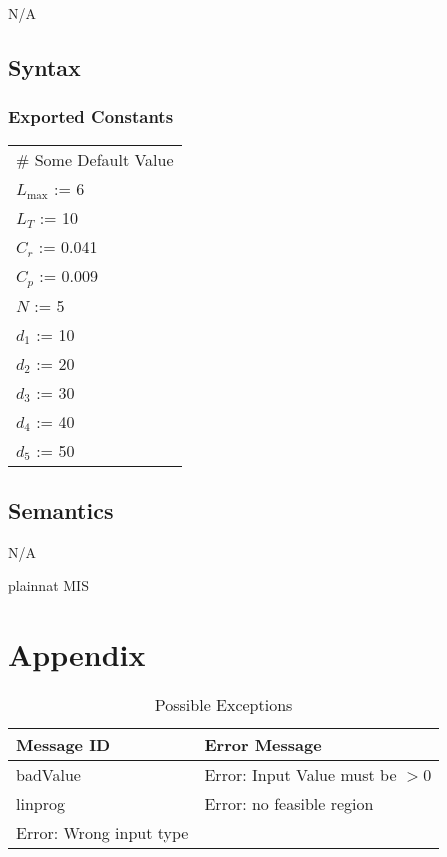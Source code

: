 \documentclass[12pt, titlepage]{article}
\begin{document}
N/A

\subsection{Syntax}

\subsubsection{Exported Constants}

\renewcommand{\arraystretch}{1.2}
\begin{longtable*}[l]{l} 
\# Some Default Value\\
  $L_\text{max}$ := 6\\
  $L_T$ := 10\\
  $C_r$ := 0.041 \\
  $C_p$ := 0.009 \\
  $N$ := 5\\
  $d_1$ := 10 \\
  $d_2$ := 20\\
  $d_3$ := 30\\
  $d_4$ := 40 \\
  $d_5$ := 50\\
  
\end{longtable*}



\subsection{Semantics}

N/A

\newpage

 {plainnat}
 {MIS}

\newpage

\section{Appendix} \label{Appendix}

\renewcommand{\arraystretch}{1.2}

\begin{longtable}{l p{12cm}}
\caption{Possible Exceptions} \\
\toprule
\textbf{Message ID} & \textbf{Error Message} \\
\midrule
badValue & Error: Input Value must be $> 0$ \\
linprog & Error: no feasible region \\
Error: Wrong input type \\

\bottomrule
\end{longtable}
\end{document}

